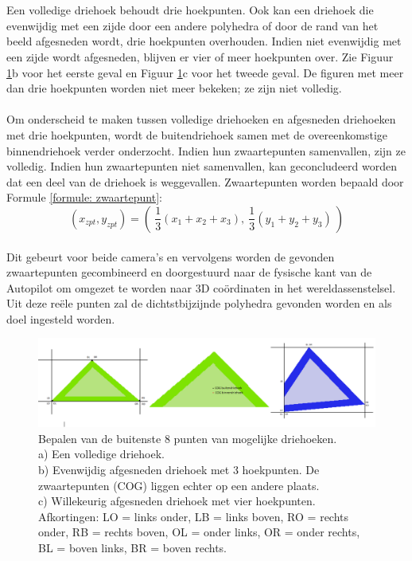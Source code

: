 \\\\
Een volledige driehoek behoudt drie hoekpunten. Ook kan een driehoek die evenwijdig met een zijde door een andere polyhedra of door de rand van het beeld afgesneden wordt, drie hoekpunten overhouden. Indien niet evenwijdig met een zijde wordt afgesneden, blijven er vier of meer hoekpunten over. Zie Figuur \ref{fig:DrieGevallenDriehoeken}b voor het eerste geval en Figuur \ref{fig:DrieGevallenDriehoeken}c voor het tweede geval. De figuren met meer dan drie hoekpunten worden niet meer bekeken; ze zijn niet volledig.
\\\\
Om onderscheid te maken tussen volledige driehoeken en afgesneden driehoeken met drie hoekpunten, wordt de buitendriehoek samen met de overeenkomstige binnendriehoek verder onderzocht. Indien hun zwaartepunten samenvallen, zijn ze volledig. Indien hun zwaartepunten niet samenvallen, kan geconcludeerd worden dat een deel van de driehoek is weggevallen. Zwaartepunten worden bepaald door Formule \ref{formule: zwaartepunt}: \begin{equation}
\label{formule: zwaartepunt}
(x_{zpt},y_{zpt}) = ( \ \frac{1}{3}(x_1 + x_2 + x_3) , \ \frac{1}{3}(y_1 + y_2 + y_3) \ )
\end{equation}
\\
Dit gebeurt voor beide camera's en vervolgens worden de gevonden zwaartepunten gecombineerd en doorgestuurd naar de fysische kant van de Autopilot om omgezet te worden naar 3D co\"ordinaten in het wereldassenstelsel. Uit deze re\"ele punten zal de dichtstbijzijnde polyhedra gevonden worden en als doel ingesteld worden.
\\
\begin{figure}[h]
	\centering
	\includegraphics[width=1\textwidth]{BeeldverwerkingDriehoeken.png}
	\caption{Bepalen van de buitenste 8 punten van mogelijke driehoeken. \\ a) Een volledige driehoek. \\ b) Evenwijdig afgesneden driehoek met 3 hoekpunten. De zwaartepunten (COG) liggen echter op een andere plaats. \\ c) Willekeurig afgesneden driehoek met vier hoekpunten. \\ 
	Afkortingen: LO = links onder, LB = links boven, RO = rechts onder, RB = rechts boven, OL = onder links, OR = onder rechts, BL = boven links, BR = boven rechts.}
	\label{fig:DrieGevallenDriehoeken}
\end{figure}

